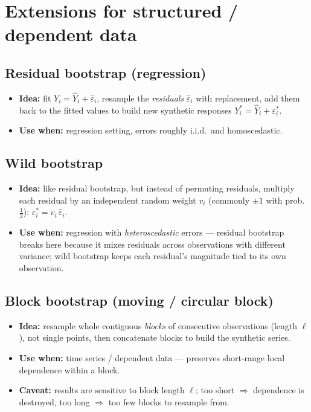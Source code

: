 \documentclass[11pt]{article}
\begin{document}
\section{Extensions for structured / dependent data}

\subsection*{Residual bootstrap (regression)}
\begin{itemize}
  \item \textbf{Idea:} fit $Y_i = \hat Y_i + \hat\varepsilon_i$, resample the \emph{residuals} $\hat\varepsilon_i$ with replacement, add them back to the fitted values to build new synthetic responses $Y_i^* = \hat Y_i + \varepsilon_i^*$.
  \item \textbf{Use when:} regression setting, errors roughly i.i.d.\ and homoscedastic.
\end{itemize}

\subsection*{Wild bootstrap}
\begin{itemize}
  \item \textbf{Idea:} like residual bootstrap, but instead of permuting residuals, multiply each residual by an independent random weight $v_i$ (commonly $\pm1$ with prob.\ $\tfrac12$): $\varepsilon_i^* = v_i\,\hat\varepsilon_i$.
  \item \textbf{Use when:} regression with \emph{heteroscedastic} errors --- residual bootstrap breaks here because it mixes residuals across observations with different variance; wild bootstrap keeps each residual's magnitude tied to its own observation.
\end{itemize}

\subsection*{Block bootstrap (moving / circular block)}
\begin{itemize}
  \item \textbf{Idea:} resample whole contiguous \emph{blocks} of consecutive observations (length $\ell$), not single points, then concatenate blocks to build the synthetic series.
  \item \textbf{Use when:} time series / dependent data --- preserves short-range local dependence within a block.
  \item \textbf{Caveat:} results are sensitive to block length $\ell$; too short $\Rightarrow$ dependence is destroyed, too long $\Rightarrow$ too few blocks to resample from.
\end{itemize}
\end{document}
